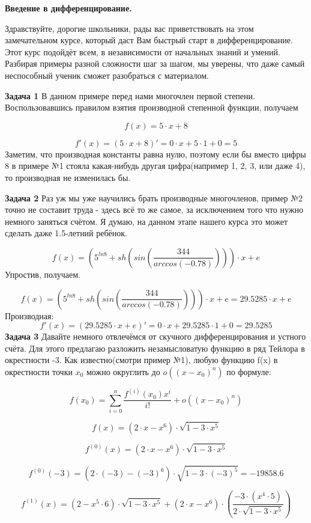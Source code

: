 \documentclass[12pt,a4paper,fleqn]{article}
\begin{document}
\begin{center}
{\bf \Large
Введение в дифференцирование.
}
\end{center}
Здравствуйте, дорогие школьники, рады вас приветствовать на этом замечательном курсе, который даст Вам быстрый старт в дифференцирование. Этот курс подойдёт всем, в независимости от начальных знаний и умений. Разбирая примеры разной сложности шаг за шагом, мы уверены, что даже самый неспособный ученик сможет разобраться с материалом.


\newpage
{\bf \Large
Задача 1
}
В данном примере перед нами многочлен первой степени. Воспользовавшись правилом взятия производной степенной функции, получаем

$$
f(x)=5\cdot x+8
$$

$$
f'(x)=(5\cdot x+8)'=0\cdot x+5\cdot1+0=5
$$
Заметим, что производная константы равна нулю, поэтому если бы вместо цифры 8 в примере №1 стояла какая-нибудь другая цифра(например 1, 2, 3, или даже 4), то производная не изменилась бы.

{\bf \Large
Задача 2
}
Раз уж мы уже научились брать производные многочленов, пример №2 точно не составит труда - здесь всё то же самое, за исключением того что нужно немного заняться счётом. Я думаю, на данном этапе нашего курса это может сделать даже 1.5-летний ребёнок.

$$
f(x)=\left(5^{ ln8}+ sh\left( sin\left(\frac{344}{ arccos\left(-0.78\right)}\right)\right)\right)\cdot x+e
$$
Упростив, получаем.

$$
f(x)=\left(5^{ ln8}+ sh\left( sin\left(\frac{344}{ arccos\left(-0.78\right)}\right)\right)\right)\cdot x+e=29.5285\cdot x+e
$$
Производная:
$$
f'(x)=(29.5285\cdot x+e)'=0\cdot x+29.5285\cdot1+0=29.5285
$$
{\bf \Large
Задача 3
}
Давайте немного отвлечёмся от скучного дифференцирования и устного счёта. Для этого предлагаю разложить незамысловатую функцию в ряд Тейлора в окрестности -3.
Как известно(смотри пример №1), любую функцию f(x) в окрестности точки $x_{0}$ можно округлить до $o((x-x_{0})^{n})$ по формуле:

$$
f(x_{0})=\sum_{i=0}^{n}\frac{f^{(i)}(x_{0})x^i}{i!} + o((x-x_{0})^{n})
$$

$$
f(x)=\left(2\cdot x- x^{6}\right)\cdot\sqrt{1-3\cdot x^{5}}
$$

$$
f^{(0)}(x)=\left(2\cdot x- x^{6}\right)\cdot\sqrt{1-3\cdot x^{5}}
$$

$$
f^{(0)}(-3)=\left(2\cdot(-3)-(-3)^{6}\right)\cdot\sqrt{1-3\cdot(-3)^{5}}=-19858.6
$$

$$
f^{(1)}(x)=\left(2- x^{5}\cdot6\right)\cdot\sqrt{1-3\cdot x^{5}}+\left(2\cdot x- x^{6}\right)\cdot\left(\frac{-3\cdot\left( x^{4}\cdot5\right)}{2\cdot\sqrt{1-3\cdot x^{5}}}\right)
$$
\end{document}
